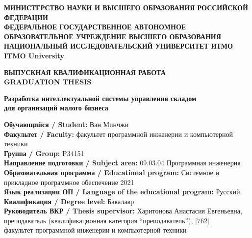 \documentclass[14pt]{article}
\begin{document}

\begin{titlepage}
\begin{center}
\onehalfspacing
\textbf{\MakeUppercase{Министерство науки и высшего образования Российской Федерации}}\\[0.5em]
\textbf{ФЕДЕРАЛЬНОЕ ГОСУДАРСТВЕННОЕ АВТОНОМНОЕ\\
ОБРАЗОВАТЕЛЬНОЕ УЧРЕЖДЕНИЕ ВЫСШЕГО ОБРАЗОВАНИЯ}\\[0.5em]
\textbf{НАЦИОНАЛЬНЫЙ ИССЛЕДОВАТЕЛЬСКИЙ УНИВЕРСИТЕТ ИТМО}\\[0.5em]
\textbf{ITMO University}
\vfill

\textbf{\Large ВЫПУСКНАЯ КВАЛИФИКАЦИОННАЯ РАБОТА}\\[0.5em]
\textbf{\Large GRADUATION THESIS}
\vfill

\begin{spacing}{1.2}
\textbf{Разработка интеллектуальной системы управления складом\\ для организаций малого бизнеса}
\end{spacing}
\vfill

\end{center}

\begin{flushleft}
\textbf{Обучающийся / Student:} Ван Минчжи\\[0.5em]
\textbf{Факультет / Faculty:} факультет программной инженерии и компьютерной техники\\[0.5em]
\textbf{Группа / Group:} P34151\\[0.5em]
\textbf{Направление подготовки / Subject area:} 09.03.04 Программная инженерия\\[0.5em]
\textbf{Образовательная программа / Educational program:} Системное и прикладное программное обеспечение 2021\\[0.5em]
\textbf{Язык реализации ОП / Language of the educational program:} Русский\\[0.5em]
\textbf{Квалификация / Degree level:} Бакалавр\\[0.5em]
\textbf{Руководитель ВКР / Thesis supervisor:} Харитонова Анастасия Евгеньевна,\\
преподаватель (квалификационная категория ``преподаватель''), [762]\\
факультет программной инженерии и компьютерной техники
\end{flushleft}
\vfill

\end{titlepage}
\end{document}
